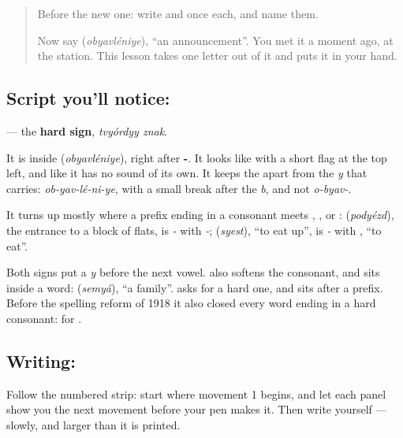 \begin{quote}
Before the new one: write  and  once each, and name them.

Now say \textbf{} (\emph{obyavléniye}), \textquotedblleft{}an announcement\textquotedblright{}. You met it a moment ago, at the station. This lesson takes one letter out of it and puts it in your hand.
\end{quote}

\subsection*{Script you'll notice: }
\textbf{} — the \textbf{hard sign}, \emph{tvyórdyy znak}.

It is inside \textbf{} (\emph{obyavléniye}), right after \textbf{-}. It looks like \textbf{} with a short flag at the top left, and like \textbf{} it has no sound of its own. It keeps the \textbf{} apart from the \emph{y} that \textbf{} carries: \emph{ob-yav-lé-ni-ye}, with a small break after the \emph{b}, and not \emph{o-byav-}.

It turns up mostly where a prefix ending in a consonant meets \textbf{}, \textbf{}, \textbf{} or \textbf{}: \textbf{} (\emph{podyézd}), the entrance to a block of flats, is \emph{-} with \emph{-}; \textbf{} (\emph{syest}), \textquotedblleft{}to eat up\textquotedblright{}, is \emph{-} with \emph{}, \textquotedblleft{}to eat\textquotedblright{}.

Both signs put a \emph{y} before the next vowel. \textbf{} also softens the consonant, and sits inside a word: \textbf{} (\emph{semyá}), \textquotedblleft{}a family\textquotedblright{}. \textbf{} asks for a hard one, and sits after a prefix. Before the spelling reform of 1918 it also closed every word ending in a hard consonant: \textbf{} for \textbf{}.

\subsection*{Writing: }

Follow the numbered strip: start where movement 1 begins, and let each panel show you the next movement before your pen makes it. Then write  yourself — slowly, and larger than it is printed.

